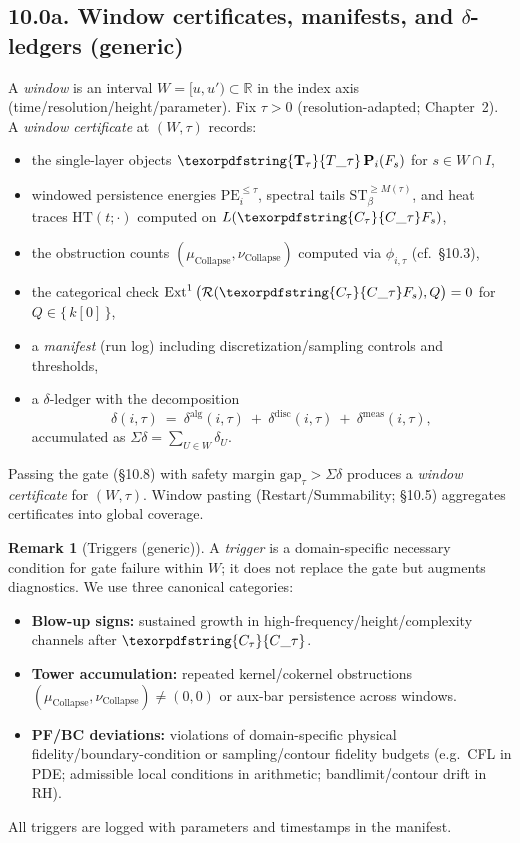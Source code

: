 \documentclass[11pt]{article}
\numberwithin{equation}{section}
\theoremstyle{plain}
\theoremstyle{definition}
\theoremstyle{remark}
\DeclareMathOperator{\Ext}{Ext}
\DeclareRobustCommand{\hyp}{\nobreakdash-}
\newcommand{\Rfun}{\mathcal{R}}
\theoremstyle{plain}
\theoremstyle{definition}
\numberwithin{equation}{section}
\theoremstyle{definition}
\newtheorem{remark}[theorem]{Remark}
\DeclareRobustCommand{\Ttau}{\texorpdfstring{\ensuremath{\mathbf{T}_{\tau}}}{T\_\tau}}
\DeclareRobustCommand{\Ctau}{\texorpdfstring{\ensuremath{C_{\tau}}}{C\_\tau}}
\DeclareRobustCommand{\muc}{\mu_{\mathrm{Collapse}}}
\DeclareRobustCommand{\nuc}{\nu_{\mathrm{Collapse}}}
\DeclareRobustCommand{\Qtest}{\{\,k[0]\,\}}
\numberwithin{equation}{section}
\theoremstyle{plain}
\theoremstyle{definition}
\theoremstyle{remark}
\providecommand{\Cfun}[1]{\mathsf{C}_{#1}}
\providecommand{\Tfun}[1]{\mathbf{T}_{#1}}
\providecommand{\Ctau}{\Cfun{\tau}}
\providecommand{\Ttau}{\Tfun{\tau}}
\providecommand{\muc}{\mu_{\mathrm{Collapse}}}
\providecommand{\nuc}{\nu_{\mathrm{Collapse}}}
\begin{document}
\subsection*{10.0a. Window certificates, manifests, and \(\delta\)\hyp ledgers (generic)}
A \emph{window} is an interval \(W=[u,u')\subset\mathbb{R}\) in the index axis (time/resolution/height/parameter).
Fix \(\tau>0\) (resolution\hyp adapted; Chapter~2). A \emph{window certificate} at \((W,\tau)\) records:
\begin{itemize}
  \item the single\hyp layer objects \(\Ttau\,\mathbf{P}_i(F_s)\) for \(s\in W\cap I\),
  \item windowed persistence energies \(\mathrm{PE}_i^{\le \tau}\), spectral tails \(\mathrm{ST}_\beta^{\ge M(\tau)}\), and heat traces \(\mathrm{HT}(t;\cdot)\) computed on \(L(\Ctau F_s)\),
  \item the obstruction counts \((\muc,\nuc)\) computed via \(\phi_{i,\tau}\) (cf.\ §10.3),
  \item the categorical check \(\Ext^1\big(\Rfun(\Ctau F_s),Q\big)=0\) for \(Q\in\Qtest\),
  \item a \emph{manifest} (run log) including discretization/sampling controls and thresholds,
  \item a \(\delta\)\hyp ledger with the decomposition
  \[
    \delta(i,\tau)\ =\ \delta^{\mathrm{alg}}(i,\tau)\ +\ \delta^{\mathrm{disc}}(i,\tau)\ +\ \delta^{\mathrm{meas}}(i,\tau),
  \]
  accumulated as \(\Sigma\delta=\sum_{U\in W}\delta_U\).
\end{itemize}
Passing the gate (§10.8) with safety margin \(\mathrm{gap}_\tau>\Sigma\delta\) produces a \emph{window certificate} for \((W,\tau)\).
Window pasting (Restart/Summability; §10.5) aggregates certificates into global coverage.

\begin{remark}[Triggers (generic)]
A \emph{trigger} is a domain\hyp specific necessary condition for gate failure within \(W\); it does not replace the gate but augments diagnostics. We use three canonical categories:
\begin{itemize}
  \item \textbf{Blow\hyp up signs:} sustained growth in high\hyp frequency/height/complexity channels after \(\Ctau\).
  \item \textbf{Tower accumulation:} repeated kernel/cokernel obstructions \((\muc,\nuc)\ne(0,0)\) or aux\hyp bar persistence across windows.
  \item \textbf{PF/BC deviations:} violations of domain\hyp specific physical fidelity/boundary\hyp condition or sampling/contour fidelity budgets (e.g.\ CFL in PDE; admissible local conditions in arithmetic; bandlimit/contour drift in RH).
\end{itemize}
All triggers are logged with parameters and timestamps in the manifest.
\end{remark}
\end{document}
